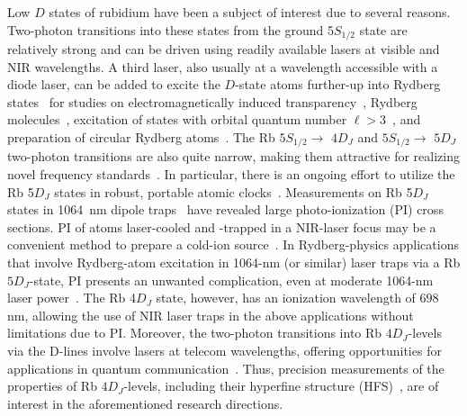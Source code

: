 \documentclass[reprint, amsmath,amssymb, aps, pra, longbibliography]{revtex4-1}
\begin{document}
Low $D$ states of rubidium have been a subject of interest due to several reasons. Two-photon transitions into these states from the ground 5$S_{1/2}$ state are relatively strong and can be driven using readily available lasers at visible and NIR wavelengths. A third laser, also usually at a wavelength accessible with a diode laser, can be added to excite the $D$-state atoms further-up into Rydberg states~\cite{thoumany2009, Fahey11, johnson2012, lim2022} for studies on electromagnetically induced transparency~\cite{carr2012, Moore2019a}, Rydberg molecules~\cite{shafferreview, feyreview, duspayev2021, deiss2021, zuber2022}, excitation of states with orbital quantum number $\ell > 3$~\cite{Younge2010, moore2020, cardman2021njp}, and preparation of circular Rydberg atoms~\cite{cardman2020, wu2023}. The Rb $5S_{1/2} \rightarrow$ $4D_J$ and $5S_{1/2} \rightarrow$ $5D_J$ two-photon transitions are also quite narrow, making them attractive for realizing novel frequency standards~\cite{hilico1998epjapmetrological, quinn2003metpractical, moon2004, terra2016apbultra, Roy17}. In particular, there is an ongoing effort to utilize the Rb 5$D_J$ states in robust, portable atomic clocks~\cite{martin2019}. Measurements on Rb 5$D_J$ states in 1064~nm dipole traps~\cite{duncan2001prameasurement, cardman2021} have revealed large photo-ionization (PI) cross sections. PI of atoms laser-cooled and -trapped in a NIR-laser focus may be a convenient method to prepare a cold-ion source~\cite{ionsourcepaper}. In Rydberg-physics applications that involve 
Rydberg-atom excitation in 1064-nm (or similar) laser traps via a Rb $5D_J$-state, PI presents an unwanted complication, even at moderate 1064-nm laser power~\cite{cardman2021, atoms10040117}.
The Rb 4$D_J$ state, however, has an ionization wavelength of $698~$nm, allowing the use of NIR laser traps in the above applications without limitations due to PI. Moreover, the two-photon transitions into Rb $4D_J$-levels via the D-lines involve lasers at telecom wavelengths, offering opportunities for applications in quantum communication~\cite{chanliere2006, Cao_2019, Menon_2020}. Thus, precision measurements of the properties of Rb $4D_J$-levels, including their hyperfine structure (HFS)~\cite{rmp1977, allegrini}, are of interest in the aforementioned research directions.
\end{document}
